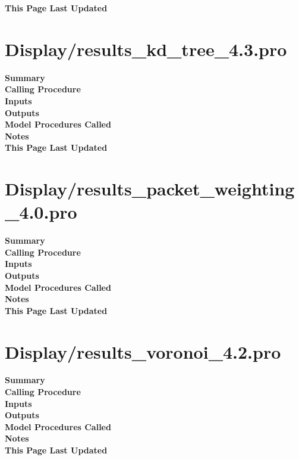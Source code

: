 \documentclass[11pt]{article}
\newcommand\descrip[1]{\textsf{\textbf{\large{#1}}}\\}
\begin{document}
\descrip{This Page Last Updated}

\clearpage

\section{Display/results\_kd\_tree\_4.3.pro} \label{sec:results_kd_tree}

\descrip{Summary}

\descrip{Calling Procedure}

\descrip{Inputs}

\descrip{Outputs}

\descrip{Model Procedures Called}

\descrip{Notes}

\descrip{This Page Last Updated}

\clearpage

\section{Display/results\_packet\_weighting\_4.0.pro}
\label{sec:results_packet_weighting}

\descrip{Summary}

\descrip{Calling Procedure}

\descrip{Inputs}

\descrip{Outputs}

\descrip{Model Procedures Called}

\descrip{Notes}

\descrip{This Page Last Updated}

\clearpage

\section{Display/results\_voronoi\_4.2.pro} \label{sec:results_voronoi}

\descrip{Summary}

\descrip{Calling Procedure}

\descrip{Inputs}

\descrip{Outputs}

\descrip{Model Procedures Called}

\descrip{Notes}

\descrip{This Page Last Updated}
\end{document}
